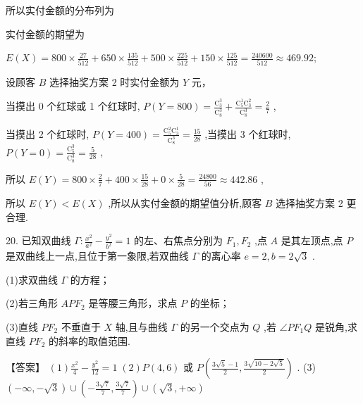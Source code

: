 \documentclass[10pt]{article}
\newcommand*\circled[1]{\tikz[baseline=(char.base)]{\node[shape=circle,draw,inner sep=1.5pt] (char) {\small #1};}}
\begin{document}
所以实付金额的分布列为

\begin{center}
\end{center}

实付金额的期望为

\(E\left( X\right)  = {800} \times  \frac{27}{512} + {650} \times  \frac{135}{512} + {500} \times  \frac{225}{512} + {150} \times  \frac{125}{512} = \frac{240600}{512} \approx  {469.92};\)

 \circled{2} 设顾客 \(B\) 选择抽奖方案 2 时实付金额为 \(Y\) 元，

当摸出 0 个红球或 1 个红球时, \(P\left( {Y = {800}}\right)  = \frac{{\mathrm{C}}_{3}^{3}}{{\mathrm{C}}_{8}^{3}} + \frac{{\mathrm{C}}_{5}^{1}{\mathrm{C}}_{3}^{2}}{{\mathrm{C}}_{8}^{3}} = \frac{2}{7}\) ,

当摸出 2 个红球时, \(P\left( {Y = {400}}\right)  = \frac{{\mathrm{C}}_{5}^{2}{\mathrm{C}}_{3}^{1}}{{\mathrm{C}}_{8}^{3}} = \frac{15}{28}\) ,当摸出 3 个红球时, \(P\left( {Y = 0}\right)  = \frac{{\mathrm{C}}_{5}^{3}}{{\mathrm{C}}_{8}^{3}} = \frac{5}{28}\) ,

所以 \(E\left( Y\right)  = {800} \times  \frac{2}{7} + {400} \times  \frac{15}{28} + 0 \times  \frac{5}{28} = \frac{24800}{56} \approx  {442.86}\) ,

所以 \(E\left( Y\right)  < E\left( X\right)\) ,所以从实付金额的期望值分析,顾客 \(B\) 选择抽奖方案 2 更合理.

20. 已知双曲线 \(\Gamma  : \frac{{x}^{2}}{{a}^{2}} - \frac{{y}^{2}}{{b}^{2}} = 1\) 的左、右焦点分别为 \({F}_{1},{F}_{2}\) ,点 \(A\) 是其左顶点,点 \(P\) 是双曲线上一点,且位于第一象限,若双曲线 \(\Gamma\) 的离心率 \(e = 2,b = 2\sqrt{3}\) .

(1)求双曲线 \(\Gamma\) 的方程；

(2)若三角形 \({AP}{F}_{2}\) 是等腰三角形，求点 \(P\) 的坐标；

(3)直线 \(P{F}_{2}\) 不垂直于 \(X\) 轴,且与曲线 \(\Gamma\) 的另一个交点为 \(Q\) ,若 \(\angle P{F}_{1}Q\) 是锐角,求直线 \(P{F}_{2}\) 的斜率的取值范围.

【答案】 \(\left( 1\right) \frac{{x}^{2}}{4} - \frac{{y}^{2}}{12} = 1\;\left( 2\right) P\left( {4,6}\right)\) 或 \(P\left( {\frac{3\sqrt{5} - 1}{2},\frac{3\sqrt{{10} - 2\sqrt{5}}}{2}}\right)\) . (3) \(\left( {-\infty , - \sqrt{3}}\right)  \cup  \left( {-\frac{3\sqrt{7}}{7},\frac{3\sqrt{7}}{7}}\right)  \cup  \left( {\sqrt{3}, + \infty }\right)\)
\end{document}
